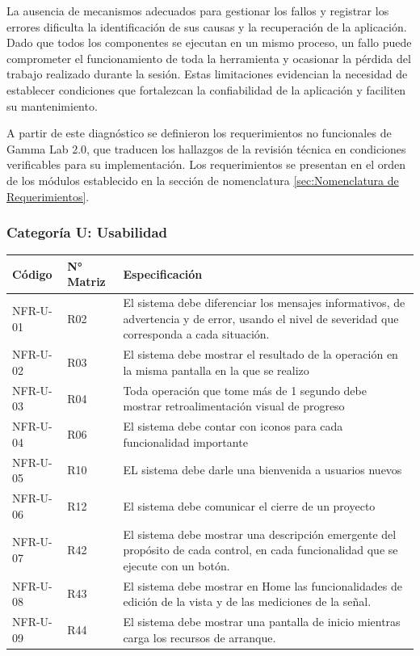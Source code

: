 \documentclass[12pt, letterpaper]{article}
\begin{document}
La ausencia de mecanismos adecuados para gestionar los fallos y registrar los errores dificulta la identificación de sus causas y la recuperación de la aplicación. Dado que todos los componentes se ejecutan en un mismo proceso, un fallo puede comprometer el funcionamiento de toda la herramienta y ocasionar la pérdida del trabajo realizado durante la sesión. Estas limitaciones evidencian la necesidad de establecer condiciones que fortalezcan la confiabilidad de la aplicación y faciliten su mantenimiento.

A partir de este diagnóstico se definieron los requerimientos no funcionales de Gamma Lab 2.0, que traducen los hallazgos de la revisión técnica en condiciones verificables para su implementación. Los requerimientos se presentan en el orden de los módulos establecido en la sección de nomenclatura \ref{sec:Nomenclatura de Requerimientos}.


\subsubsection{Categoría U: Usabilidad}

\begin{longtable}{|p{2.5cm}|p{2.5cm}|p{10.1cm}|}
\hline
\rowcolor{gray!25}
\textbf{Código} & \textbf{N° Matriz} & \textbf{Especificación} \\
\hline
\endhead

\hline
\endlastfoot

NFR-U-01 & R02 & El sistema debe diferenciar los mensajes informativos, de advertencia y de error, usando el nivel de severidad que corresponda a cada situación. \\
\hline
NFR-U-02 & R03 & El sistema debe mostrar el resultado de la operación en la misma pantalla en la que se realizo \\
\hline
NFR-U-03 & R04 & Toda operación que tome más de 1 segundo debe mostrar retroalimentación visual de progreso \\
\hline
NFR-U-04 & R06 & El sistema debe contar con iconos para cada funcionalidad importante \\
\hline
NFR-U-05 & R10 & EL sistema debe darle una bienvenida a usuarios nuevos \\
\hline
NFR-U-06 & R12 & El sistema debe comunicar el cierre de un proyecto \\
\hline
NFR-U-07 & R42 & El sistema debe mostrar una descripción emergente del propósito de cada control, en cada funcionalidad que se ejecute con un botón. \\
\hline
NFR-U-08 & R43 & El sistema debe mostrar en Home las funcionalidades de edición de la vista y de las mediciones de la señal. \\
\hline
NFR-U-09 & R44 & El sistema debe mostrar una pantalla de inicio mientras carga los recursos de arranque. \\

\end{longtable}
\vspace{-0.5em}
\label{tab:nfr-u}
\end{document}
